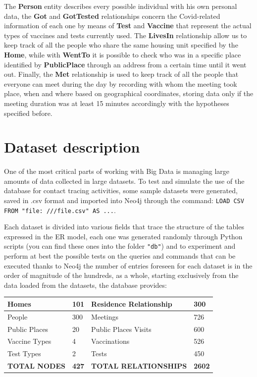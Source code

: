 \documentclass[a4paper,12pt]{article}
\begin{document}
The \textbf{Person} entity describes every possible individual with his own personal data, the \textbf{Got} and \textbf{GotTested} relationships concern the Covid-related information of each one by means of \textbf{Test} and \textbf{Vaccine} that represent the actual types of vaccines and tests currently used. The \textbf{LivesIn} relationship allow us to keep track of all the people who share the same housing unit specified by the \textbf{Home}, while with \textbf{WentTo} it is possible to check who was in a specific place identified by \textbf{PublicPlace} through an address from a certain time until it went out. Finally, the \textbf{Met} relationship is used to keep track of all the people that everyone can meet during the day by recording with whom the meeting took place, when and where based on geographical coordinates, storing data only if the meeting duration was at least 15 minutes accordingly with the hypotheses specified before.
\section{Dataset description}
\paragraph{} One of the most critical parts of working with Big Data is managing large amounts of data collected in large datasets. To test and simulate the use of the database for contact tracing activities, some sample datasets were generated, saved in .csv format and imported into Neo4j through the command: \texttt{LOAD CSV FROM "file: ///file.csv" AS ...}. \par
Each dataset is divided into various fields that trace the structure of the tables expressed in the ER model, each one was generated randomly through Python scripts (you can find these ones into the folder \texttt{"db"}) and to experiment and perform at best the possible tests on the queries and commands that can be executed thanks to Neo4j the number of entries foreseen for each dataset is in the order of magnitude of the hundreds, as a whole, starting exclusively from the data loaded from the datasets, the database provides:
\begin{center}
\begin{tabular}{|l|l|l|l|}
\hline
Homes & 101 & Residence Relationship & 300 \\
\hline
People & 300 & Meetings & 726 \\
\hline
Public Places & 20 & Public Places Visits & 600 \\
\hline
Vaccine Types & 4 & Vaccinations & 526 \\
\hline
Test Types & 2 & Tests & 450\\
\hline
\textbf{TOTAL NODES} & \textbf{427} & \textbf{TOTAL RELATIONSHIPS} & \textbf{2602}\\
\hline
\end{tabular}
\end{center}
\end{document}
